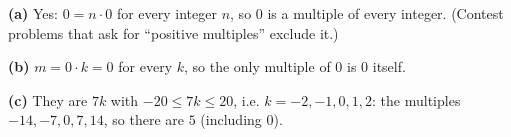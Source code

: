 \textbf{(a)} Yes: $0=n\cdot0$ for every integer $n$, so $0$ is a multiple of every integer. (Contest problems that ask for ``positive multiples'' exclude it.)

\textbf{(b)} $m=0\cdot k=0$ for every $k$, so the only multiple of $0$ is $\boxed{0}$ itself.

\textbf{(c)} They are $7k$ with $-20\le7k\le20$, i.e. $k=-2,-1,0,1,2$: the multiples $-14,-7,0,7,14$, so there are $\boxed{5}$ (including $0$).
